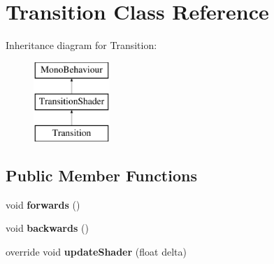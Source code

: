 \hypertarget{class_transition}{\section{Transition Class Reference}
\label{class_transition}
}
Inheritance diagram for Transition\-:\begin{figure}[H]
\begin{center}
\leavevmode
\includegraphics[height=3.000000cm]{class_transition}
\end{center}
\end{figure}
\subsection*{Public Member Functions}
\begin{DoxyCompactItemize}
\item 
\hypertarget{class_transition_af952690a90e0fa9e87f31ccb9f8e15e0}{void {\bfseries forwards} ()}\label{class_transition_af952690a90e0fa9e87f31ccb9f8e15e0}

\item 
\hypertarget{class_transition_a355b09e04439c9c2e5c2cb41183057af}{void {\bfseries backwards} ()}\label{class_transition_a355b09e04439c9c2e5c2cb41183057af}

\item 
\hypertarget{class_transition_ab9fc84a48414ad28759401260ca0b954}{override void {\bfseries update\-Shader} (float delta)}\label{class_transition_ab9fc84a48414ad28759401260ca0b954}

\end{DoxyCompactItemize}
